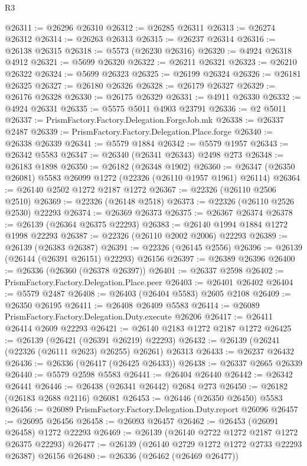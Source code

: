 \begin{lexlean}{R3}
\begin{coremodule}
@26311 := @26296 @26310
@26312 := @26285 @26311
@26313 := @26274 @26312
@26314 := @26263 @26313
@26315 := @26237 @26314
@26316 := @26138 @26315
@26318 := @5573 (@26230 @26316)
@26320 := @4924 @26318 @4912
@26321 := @5699 @26320
@26322 := @26211 @26321
@26323 := @26210 @26322
@26324 := @5699 @26323
@26325 := @26199 @26324
@26326 := @26181 @26325
@26327 := @26180 @26326
@26328 := @26179 @26327
@26329 := @26176 @26328
@26330 := @26175 @26329
@26331 := @4911 @26330
@26332 := @4924 @26331
@26335 := @5575 @5011 @4903 @23791
@26336 := @2 @5011
@26337 := PrismFactory.Factory.Delegation.ForgeJob.mk
@26338 := @26337 @2487
@26339 := PrismFactory.Factory.Delegation.Place.forge
@26340 := @26338 @26339
@26341 := @5579 @1884
@26342 := @5579 @1957
@26343 := @26342 @5583
@26347 := @26340 (@26341 @26343) @2498 @273
@26348 := @26183 @1898
@26350 := @26182 (@26348 @1902)
@26360 := @26347 (@26350 @26081) @5583 @26099 @1272 (@22326 (@26110 @1957 @1961) @26114)
@26364 := @26140 @2502 @1272 @2187 @1272
@26367 := @22326 (@26110 @2506 @2510)
@26369 := @22326 (@26148 @2518)
@26373 := @22326 (@26110 @2526 @2530) @22293
@26374 := @26369 @26373
@26375 := @26367 @26374
@26378 := @26139 (@26364 @26375 @22293)
@26383 := @26140 @1994 @1884 @1272 @1998 @22293
@26387 := @22326 (@26110 @2002 @2006) @22293
@26389 := @26139 (@26383 @26387)
@26391 := @22326 (@26145 @2556)
@26396 := @26139 (@26144 (@26391 @26151) @22293) @26156
@26397 := @26389 @26396
@26400 := @26336 (@26360 (@26378 @26397))
@26401 := @26337 @2598
@26402 := PrismFactory.Factory.Delegation.Place.peer
@26403 := @26401 @26402
@26404 := @5579 @2487
@26408 := @26403 (@26404 @5583) @2605 @2108
@26409 := @26350 @26195
@26411 := @26408 @26409 @5583
@26414 := @26089 PrismFactory.Factory.Delegation.Duty.execute @26206
@26417 := @26411 @26414 @2609 @22293
@26421 := @26140 @2183 @1272 @2187 @1272
@26425 := @26139 (@26421 (@26391 @26219) @22293)
@26432 := @26139 (@26241 (@22326 (@26111 @2623) @26255) @26261) @26313
@26433 := @26237 @26432
@26436 := @26336 (@26417 (@26425 @26433))
@26438 := @26337 @2665 @26339
@26440 := @5579 @2598 @5583
@26441 := @26404 @26440
@26442 := @26342 @26441
@26446 := @26438 (@26341 @26442) @2684 @273
@26450 := @26182 (@26183 @2688 @2116) @26081
@26453 := @26446 (@26350 @26450) @5583
@26456 := @26089 PrismFactory.Factory.Delegation.Duty.report @26096
@26457 := @26095 @26456
@26458 := @26093 @26457
@26462 := @26453 (@26091 @26458) @1272 @22293
@26469 := @26139 (@26140 @2722 @1272 @2187 @1272 @26375 @22293)
@26477 := @26139 (@26140 @2729 @1272 @1272 @2733 @22293 @26387) @26156
@26480 := @26336 (@26462 (@26469 @26477))

\end{coremodule}
\end{lexlean}
